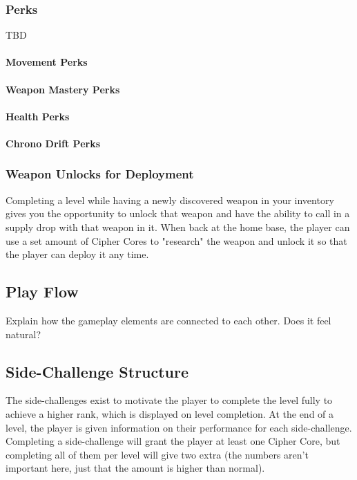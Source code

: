 \documentclass[12pt]{article}
\begin{document}
\subsubsection{Perks}

TBD

\paragraph{Movement Perks}

\paragraph{Weapon Mastery Perks}

\paragraph{Health Perks}

\paragraph{Chrono Drift Perks}

\subsubsection{Weapon Unlocks for Deployment}

Completing a level while having a newly discovered weapon in your inventory gives you the opportunity to unlock that weapon and have the ability to call in a supply drop with that weapon in it. When back at the home base, the player can use a set amount of Cipher Cores to "research" the weapon and unlock it so that the player can deploy it any time. 

\subsection{Play Flow}

Explain how the gameplay elements are connected to each other. Does it feel natural?

\subsection{Side-Challenge Structure}

The side-challenges exist to motivate the player to complete the level fully to achieve a higher rank, which is displayed on level completion. At the end of a level, the player is given information on their performance for each side-challenge. Completing a side-challenge will grant the player at least one Cipher Core, but completing all of them per level will give two extra (the numbers aren't important here, just that the amount is higher than normal). 
\end{document}
